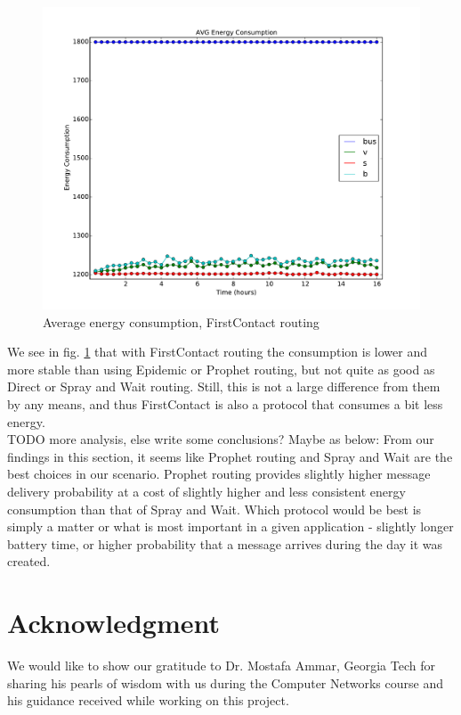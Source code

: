 \documentclass[conference]{IEEEtran}
\begin{document}
\begin{figure}
  \includegraphics[scale=0.25, center]{../one_1.5.1-RC2/plots/FirstContact_AVG_ENERGY_CONSUMPTION.pdf}
  \caption{Average energy consumption, FirstContact routing}
  \label{fig:avg_consumpt:firstcontact}
\end{figure}

We see in fig. \ref{fig:avg_consumpt:firstcontact} that with FirstContact routing the consumption is lower and more stable than using Epidemic or Prophet routing, but not quite as good as Direct or Spray and Wait routing. Still, this is not a large difference from them by any means, and thus FirstContact is also a protocol that consumes a bit less energy.\\

{\color{red}
  TODO more analysis, else write some conclusions? Maybe as below:
}
From our findings in this section, it seems like Prophet routing and Spray and Wait are the best choices in our scenario. Prophet routing provides slightly higher message delivery probability at a cost of slightly higher and less consistent energy consumption than that of Spray and Wait. Which protocol would be best is simply a matter or what is most important in a given application - slightly longer battery time, or higher probability that a message arrives during the day it was created.


\section*{Acknowledgment}

We would like to show our gratitude to Dr. Mostafa Ammar, Georgia Tech for sharing his pearls of wisdom with us during the Computer Networks course and his guidance received while working on this project.




\end{document}

